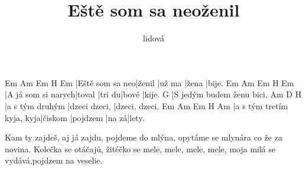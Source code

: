 \documentclass{song}
\title{Eště som sa neoženil}
\author{lidová}
\begin{document}
\strophe
Em              Am     Em     H\7   Em
|Eště som sa neo|ženil |už ma |žena |bije.
Em                 Am     Em     H\7   Em
|A já som si narych|toval |tri du|bové |kije.
G
|S jedým budem ženu bici,
Am              D             H\7
|a s tým druhým |dzeci dzeci, |dzeci, dzeci,
Em                        Am      Em       H\7   Am
|a s tým tretím kyja, kyja|čiskom |pojdzem |na zá|lety.
\endstrophe

\strophe*
Kam ty zajdeš, aj já zajdu, pojdeme do mlýna,
opytáme se mlynára co že za novina.
Kolečka se otáčajů,
žitéčko se mele, mele, mele, mele,
moja milá se vydává,pojdzem na veselie.
\endstrophe
\end{document}
